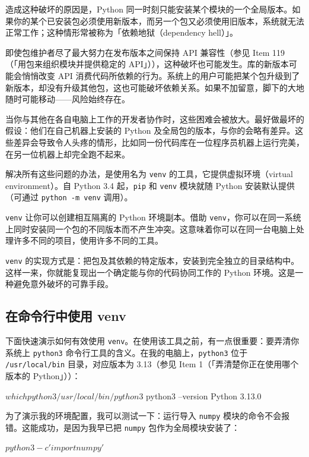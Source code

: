 造成这种破坏的原因是，Python 同一时刻只能安装某个模块的一个全局版本。如果你的某个已安装包必须使用新版本，而另一个包又必须使用旧版本，系统就无法正常工作；这种情形常被称为「依赖地狱（dependency hell）」。

即使包维护者尽了最大努力在发布版本之间保持 API 兼容性（参见 Item 119（「用包来组织模块并提供稳定的 API」）），这种破坏也可能发生。库的新版本可能会悄悄改变 API 消费代码所依赖的行为。系统上的用户可能把某个包升级到了新版本，却没有升级其他包，这也可能破坏依赖关系。如果不加留意，脚下的大地随时可能移动——风险始终存在。

当你与其他在各自电脑上工作的开发者协作时，这些困难会被放大。最好做最坏的假设：他们在自己机器上安装的 Python 及全局包的版本，与你的会略有差异。这些差异会导致令人头疼的情形，比如同一份代码库在一位程序员机器上运行完美，在另一位机器上却完全跑不起来。

解决所有这些问题的办法，是使用名为 \texttt{venv} 的工具，它提供虚拟环境（virtual environment）。自 Python 3.4 起，\texttt{pip} 和 \texttt{venv} 模块就随 Python 安装默认提供（可通过 \texttt{python -m venv} 调用）。

\texttt{venv} 让你可以创建相互隔离的 Python 环境副本。借助 \texttt{venv}，你可以在同一系统上同时安装同一个包的不同版本而不产生冲突。这意味着你可以在同一台电脑上处理许多不同的项目，使用许多不同的工具。

\texttt{venv} 的实现方式是：把包及其依赖的特定版本，安装到完全独立的目录结构中。这样一来，你就能复现出一个确定能与你的代码协同工作的 Python 环境。这是一种避免意外破坏的可靠手段。

\subsection{在命令行中使用 venv}

下面快速演示如何有效使用 \texttt{venv}。在使用该工具之前，有一点很重要：要弄清你系统上 \texttt{python3} 命令行工具的含义。在我的电脑上，\texttt{python3} 位于 \texttt{/usr/local/bin} 目录，对应版本为 3.13（参见 Item 1（「弄清楚你正在使用哪个版本的 Python」））：

\begin{codebox}[python]
$ which python3
/usr/local/bin/python3
$ python3 --version
Python 3.13.0
\end{codebox}

为了演示我的环境配置，我可以测试一下：运行导入 \texttt{numpy} 模块的命令不会报错。这能成功，是因为我早已把 \texttt{numpy} 包作为全局模块安装了：

\begin{codebox}[python]
$ python3 -c 'import numpy'
$
\end{codebox}

